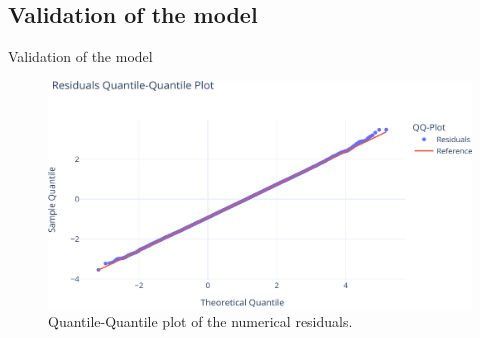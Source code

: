 
\subsection{Validation of the model}
\begin{frame}{Validation of the model}
    \begin{figure}[htb]
        \centering
        \includegraphics[scale=0.6]{assets/qq_plot.png}
        \caption{Quantile-Quantile plot of the numerical residuals.}
         \label{fig:fig_qq}
     \end{figure}
\end{frame}